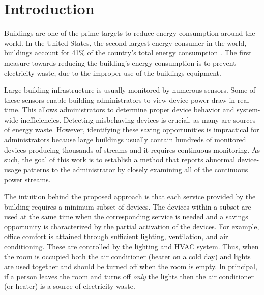 \section{Introduction}
Buildings are one of the prime targets to reduce energy consumption around the world.
In the United States, the second largest energy consumer in the world, buildings account for 41\% of the country's total energy consumption \cite{aer2011}.
The first measure towards reducing the building's energy consumption is to prevent electricity waste, due to the improper use of the buildings equipment.

Large building infrastructure is usually monitored by numerous sensors.
Some of these sensors enable building administrators to view device power-draw in real time.  This allows administrators
 to determine proper device behavior and system-wide inefficiencies.
Detecting misbehaving devices is crucial, as many are sources of energy waste.  %
However, identifying these saving opportunities is impractical for administrators because large buildings usually contain hundreds of monitored devices
producing thousands of streams and it requires continuous monitoring.%
As such, the goal of this work is to establish a method that reports abnormal device-usage patterns to the administrator by closely examining 
all of the continuous power streams.

The intuition behind the proposed approach is that each service provided by the building requires a minimum subset of devices.
The devices within a subset are used at the same time when the corresponding service is needed and a savings opportunity is characterized by the partial activation of the devices.
For example, office comfort is attained through sufficient lighting, ventilation, and air conditioning.
These are controlled by the lighting and HVAC system.
Thus, when the room is occupied both the air conditioner (heater on a cold day) and lights are used together and should be turned off 
when the room is empty.
In principal, if a person leaves the room and turns off \emph{only} the lights then the air conditioner (or heater) is a source of electricity waste.

